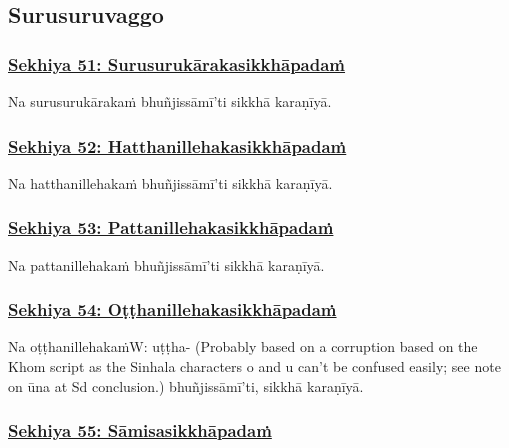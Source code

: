 \subsection{Surusuruvaggo}

\subsubsection*{\hyperref[training51]{Sekhiya 51: Surusurukārakasikkhāpadaṁ}}
\label{sekh51}

Na surusurukārakaṁ bhuñjissāmī'ti sikkhā karaṇīyā.



\subsubsection*{\hyperref[training52]{Sekhiya 52: Hatthanillehakasikkhāpadaṁ}}
\label{sekh52}

Na hatthanillehakaṁ bhuñjissāmī'ti sikkhā karaṇīyā.



\subsubsection*{\hyperref[training53]{Sekhiya 53: Pattanillehakasikkhāpadaṁ}}
\label{sekh53}

Na pattanillehakaṁ bhuñjissāmī'ti sikkhā karaṇīyā.



\subsubsection*{\hyperref[training54]{Sekhiya 54: Oṭṭhanillehakasikkhāpadaṁ}}
\label{sekh54}

Na oṭṭhanillehakaṁ\makeatletter\hyperlink{endnote-appendix}\makeatother W: uṭṭha- (Probably based on a corruption based on the Khom script as the Sinhala characters o and u can't be confused
easily; see note on ūna at Sd conclusion.) bhuñjissāmī'ti, sikkhā karaṇīyā.



\subsubsection*{\hyperref[training55]{Sekhiya 55: Sāmisasikkhāpadaṁ}}
\label{sekh55}

